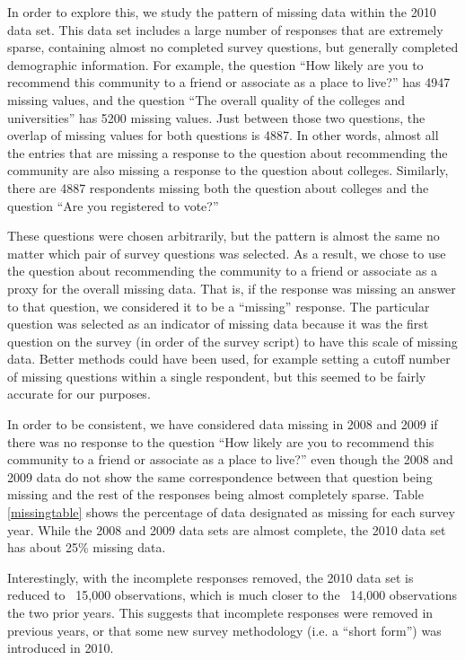 \documentclass[smallextended]{svjour3}\usepackage[]{graphicx}\usepackage[]{color}
\begin{document}
In order to explore this, we study the pattern of missing data within the 2010 data set. This data set includes a large number of responses that are extremely sparse, containing almost no completed survey questions, but generally completed demographic information. For example, the question ``How likely are you to recommend this community to a friend or associate as a place to live?'' has 4947 missing values, and the question ``The overall quality of the colleges and universities'' has 5200 missing values. Just between those two questions, the overlap of missing values for both questions is 4887. In other words, almost all the entries that are missing a response to the question about recommending the community are also missing a response to the question about colleges. Similarly, there are 4887 respondents missing both the question about colleges and the question ``Are you registered to vote?''

These questions were chosen arbitrarily, but the pattern is almost the same no matter which pair of survey questions was selected. As a result, we chose to use the question about recommending the community to a friend or associate as a proxy for the overall missing data. That is, if the response was missing an answer to that question, we considered it to be a ``missing'' response. The particular question was selected as an indicator of missing data because it was the first question on the survey (in order of the survey script) to have this scale of missing data. Better methods could have been used, for example setting a cutoff number of missing questions within a single respondent, but this seemed to be fairly accurate for our purposes. 

In order to be consistent, we have considered data missing in 2008 and 2009 if there was no response to the question ``How likely are you to recommend this community to a friend or associate as a place to live?'' even though the 2008 and 2009 data do not show the same correspondence between that question being missing and the rest of the responses being almost completely sparse. Table \ref{missingtable} shows the percentage of data designated as missing for each survey year. While the 2008 and 2009 data sets are almost complete, the 2010 data set has about 25\% missing data.

Interestingly, with the incomplete responses removed, the 2010 data set is reduced to ~15,000 observations, which is much closer to the ~14,000 observations the two prior years. This suggests that incomplete responses were removed in previous years, or that some new survey methodology (i.e. a ``short form'') was introduced in 2010. 
\end{document}
